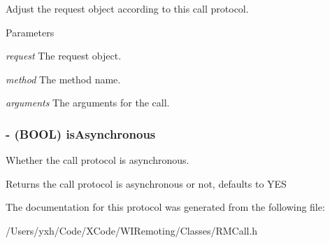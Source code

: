 Adjust the request object according to this call protocol. 
\begin{DoxyParams}{Parameters}
\item[{\em request}]The request object. \item[{\em method}]The method name. \item[{\em arguments}]The arguments for the call. \end{DoxyParams}
\hypertarget{protocol_r_m_call_protocol-p_ae4432e31198f1f116480ec4f1ed46d92}{
\subsubsection[{isAsynchronous}]{\setlength{\rightskip}{0pt plus 5cm}-\/ (BOOL) isAsynchronous }}
\label{protocol_r_m_call_protocol-p_ae4432e31198f1f116480ec4f1ed46d92}


Whether the call protocol is asynchronous. \begin{DoxyReturn}{Returns}
the call protocol is asynchronous or not, defaults to YES 
\end{DoxyReturn}


The documentation for this protocol was generated from the following file:\begin{DoxyCompactItemize}
\item 
/Users/yxh/Code/XCode/WIRemoting/Classes/RMCall.h\end{DoxyCompactItemize}

